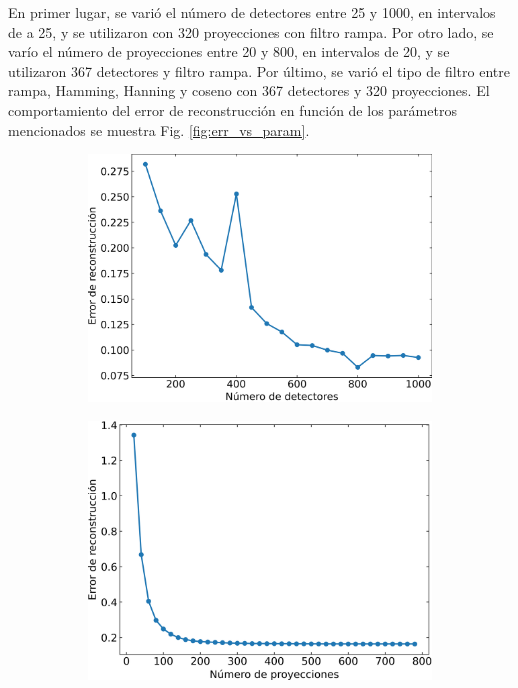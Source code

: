 \documentclass[letterpaper,12pt]{article}
\theoremstyle{plain}
\begin{document}
En primer lugar, se varió el número de detectores entre 25 y 1000, en intervalos de a 25, y se utilizaron con 320 proyecciones con filtro rampa. Por otro lado, se varío el número de proyecciones entre 20 y 800, en intervalos de 20, y se utilizaron 367 detectores y filtro rampa. Por último, se varió el tipo de filtro entre rampa, Hamming, Hanning y coseno con 367 detectores y 320 proyecciones. El comportamiento del error de reconstrucción en función de los parámetros mencionados se muestra Fig. \ref{fig:err_vs_param}.

\begin{figure}[H]
   \centering
        \begin{subfigure}[h]{0.32\linewidth}
           \centering
           \includegraphics[width=\textwidth]{Figuras/error_vs_detectores.png}
           \caption{} 
           \label{fig:err_det}
        \end{subfigure}
        \begin{subfigure}[h]{0.32\linewidth}
           \centering
           \includegraphics[width=\textwidth]{Figuras/error_vs_proyecciones.png}

\end{subfigure}
\end{figure}
\end{document}
